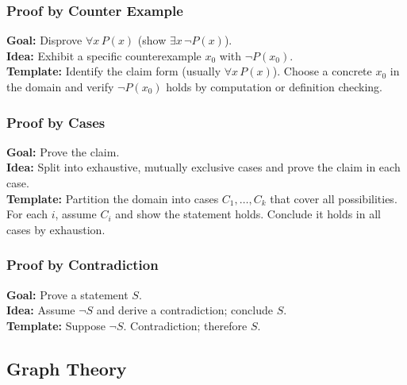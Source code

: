 \documentclass[5pt]{article}
\begin{document}
\begin{multicols}{2}
\subsubsection{Proof by Counter Example}
\textbf{Goal:} Disprove $\forall x\,P(x)$ (show $\exists x\,\lnot P(x)$).\\
\textbf{Idea:} Exhibit a specific counterexample $x_0$ with $\lnot P(x_0)$.\\
\textbf{Template:} Identify the claim form (usually $\forall x\,P(x)$). Choose a concrete $x_0$ in the domain and verify $\lnot P(x_0)$ holds by computation or definition checking.\\

\subsubsection{Proof by Cases}
\textbf{Goal:} Prove the claim.\\
\textbf{Idea:} Split into exhaustive, mutually exclusive cases and prove the claim in each case.\\
\textbf{Template:} Partition the domain into cases $C_1,\dots,C_k$ that cover all possibilities. For each $i$, assume $C_i$ and show the statement holds. Conclude it holds in all cases by exhaustion.\\

\subsubsection{Proof by Contradiction}
\textbf{Goal:} Prove a statement $S$.\\
\textbf{Idea:} Assume $\lnot S$ and derive a contradiction; conclude $S$.\\
\textbf{Template:} Suppose $\lnot S$. \; \;\; Contradiction; therefore $S$.\\



\subsection{Graph Theory}



\end{multicols}
\end{document}
